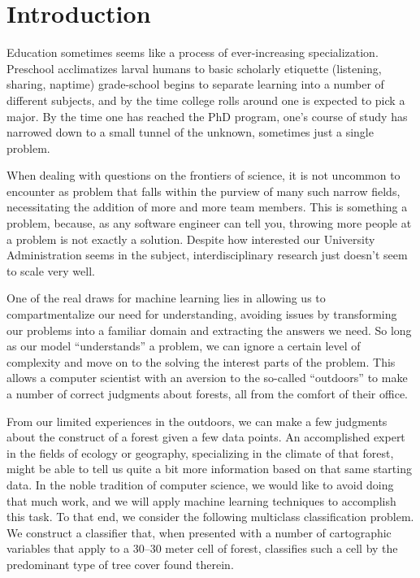 \section{Introduction}
\label{sec:-intro}

Education sometimes seems like a process of ever-increasing 
specialization. Preschool acclimatizes larval humans to basic
scholarly etiquette (listening, sharing, naptime) grade-school begins 
to separate learning into a number of different subjects, and by the 
time college rolls around one is expected to pick a major.  By the time 
one has reached the PhD program, one's course of study has narrowed 
down to a small tunnel of the unknown, sometimes just a single problem.

When dealing with questions on the frontiers of science, it is not 
uncommon to encounter as problem that falls within the purview of many
such narrow fields, necessitating the addition of more and more team 
members.  This is something a problem, because, as any software engineer 
can tell you\cite{mythical}, throwing more people at a problem is not 
exactly a solution.  Despite how interested our University 
Administration seems in the subject, interdisciplinary research 
just doesn't seem to scale very well.

One of the real draws for machine learning lies in allowing us to 
compartmentalize our need for understanding, avoiding issues by 
transforming our problems into a familiar domain and extracting 
the answers we need.  So long as our model ``understands'' a problem, 
we can ignore a certain level of complexity and move on to the 
solving the interest parts of the problem.  This allows a computer 
scientist with an aversion to the so-called ``outdoors'' to make a 
number of correct judgments about forests, all from the comfort of 
their office.

From our limited experiences in the outdoors, we can make a few judgments about
the construct of a forest given a few data points. An accomplished expert 
in the fields of ecology or geography, specializing in the climate of 
that forest, might be able to tell us quite a bit more information based 
on that same starting data.  In the noble tradition of computer science, we 
would like to avoid doing that much work, and we will apply machine 
learning techniques to accomplish this task.  To that end, we consider 
the following multiclass classification problem. We construct a 
classifier that, when presented with a number of cartographic variables 
that apply to a 30--30 meter cell of forest, classifies such a cell by 
the predominant type of tree cover found therein.

